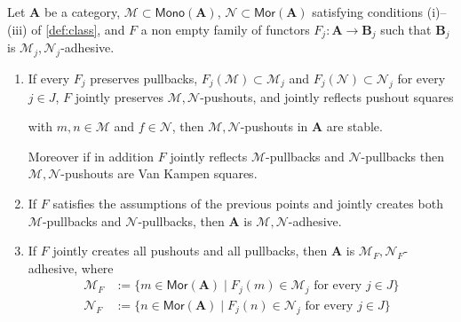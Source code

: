 \documentclass[runningheads,envcountsect]{lmcs}
\newcommand{\catname}[1]{\mathbf{#1}}
\newcommand{\arr}[1]{\mathsf{Mor}(\catname{#1})}
\newcommand{\mono}[1]{\mathsf{Mono}(\catname{#1})}
\theoremstyle{plain}
\theoremstyle{definition}
\begin{document}
\begin{thm}\label{func}
	Let $\catname{A}$ be a category, $\mathcal{M}\subset \mono{A}$, $\mathcal{N}\subset \arr{A}$  satisfying conditions (i)--(iii) of \cref{def:class}, and
	$F$ a  non empty family of functors  $F_j:\catname{A}\rightarrow \catname{B}_j$  such that  $\catname{B}_j$ is $\mathcal{M}_j,\mathcal{N}_j$-adhesive. %
	\begin{enumerate}
		\item If every $F_j$ preserves pullbacks,  $F_j(\mathcal{M})\subset \mathcal{M}_j$ and $F_j(\mathcal{N})\subset \mathcal{N}_j$ for every $j\in J$, $F$ jointly preserves $\mathcal{M}, \mathcal{N}$-pushouts, and jointly reflects pushout squares
		\begin{center}
		\end{center}
		with $m, n\in \mathcal{M}$ and $f\in \mathcal{N}$, then $\mathcal{M}, \mathcal{N}$-pushouts in $\catname{A}$ are stable. 
		
		Moreover if in addition $F$ jointly reflects $\mathcal{M}$-pullbacks and $\mathcal{N}$-pullbacks then $\mathcal{M}, \mathcal{N}$-pushouts are Van Kampen squares.
		\item If $F$ satisfies the assumptions of the previous points and jointly creates both $\mathcal{M}$-pullbacks and $\mathcal{N}$-pullbacks, then $\catname{A}$ is $\mathcal{M}, \mathcal{N}$-adhesive.
		\item If $F$ jointly creates all pushouts and all pullbacks, then $\catname{A}$ is $\mathcal{M}_F,\mathcal{N}_F$-adhesive, where
		\begin{align*}
			\mathcal{M}_F&:=\{m\in \arr{A}\mid F_j(m)\in \mathcal{M}_j \text{ for every } j\in J\}\\
			\mathcal{N}_F&:=\{n\in \arr{A}\mid F_j(n)\in \mathcal{N}_j \text{ for every } j\in J\}
		\end{align*}
	\end{enumerate}
\end{thm}
\end{document}

